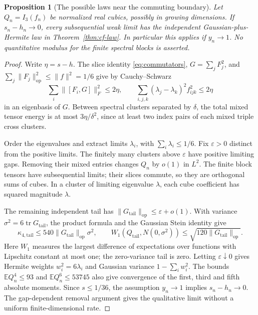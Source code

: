 \documentclass[11pt]{article}
\newtheorem{proposition}{Proposition}
\newcommand{\E}{\mathbb E}
\newcommand{\tr}{\operatorname{tr}}
\newcommand{\norm}[1]{\lVert #1\rVert}
\begin{document}
\begin{proposition}[The possible laws near the commuting boundary]\label{prop:law-closure}
Let $Q_n=I_3(f_n)$ be normalized real cubics, possibly in growing dimensions. If $s_n-h_n\to0$, every subsequential weak limit has the independent Gaussian-plus-Hermite law in Theorem~\ref{thm:cf-law}. In particular this applies if $y_n\to1$. No quantitative modulus for the finite spectral blocks is asserted.
\end{proposition}
\begin{proof}
Write $\eta=s-h$. The slice identity \eqref{eq:commutators}, $G=\sum_jF_j^2$, and $\sum_j\norm{F_j}_{\mathrm{op}}^2\le\norm f^2=1/6$ give by Cauchy--Schwarz
\begin{equation*}
 \sum_i\norm{[F_i,G]}_F^2\le2\eta,
 \qquad
 \sum_{i,j,k}(\lambda_j-\lambda_k)^2f_{ijk}^2\le2\eta
\end{equation*}
in an eigenbasis of $G$. Between spectral clusters separated by $\delta$, the total mixed tensor energy is at most $3\eta/\delta^2$, since at least two index pairs of each mixed triple cross clusters.

Order the eigenvalues and extract limits $\lambda_i$, with $\sum_i\lambda_i\le1/6$. Fix $\varepsilon>0$ distinct from the positive limits. The finitely many clusters above $\varepsilon$ have positive limiting gaps. Removing their mixed entries changes $Q_n$ by $o(1)$ in $L^2$. The finite block tensors have subsequential limits; their slices commute, so they are orthogonal sums of cubes. In a cluster of limiting eigenvalue $\lambda$, each cube coefficient has squared magnitude $\lambda$.

The remaining independent tail has $\norm{G_{\mathrm{tail}}}_{\mathrm{op}}\le\varepsilon+o(1)$. With variance $\sigma^2=6\tr G_{\mathrm{tail}}$, the product formula and the Gaussian Stein identity give
\begin{equation*}
 \kappa_{4,\mathrm{tail}}\le540\norm{G_{\mathrm{tail}}}_{\mathrm{op}}\sigma^2,
 \qquad
 W_1(Q_{\mathrm{tail}},N(0,\sigma^2))
 \le\sqrt{120\norm{G_{\mathrm{tail}}}_{\mathrm{op}}}.
\end{equation*}
Here $W_1$ measures the largest difference of expectations over functions with Lipschitz constant at most one; the zero-variance tail is zero. Letting $\varepsilon\downarrow0$ gives Hermite weights $w_i^2=6\lambda_i$ and Gaussian variance $1-\sum_iw_i^2$. The bounds $\E Q_n^4\le93$ and $\E Q_n^6\le53745$ also give convergence of the first, third and fifth absolute moments. Since $s\le1/36$, the assumption $y_n\to1$ implies $s_n-h_n\to0$. The gap-dependent removal argument gives the qualitative limit without a uniform finite-dimensional rate.
\end{proof}
\end{document}
